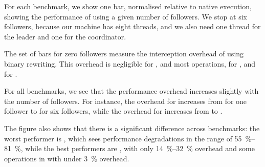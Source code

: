 For each benchmark, we show one bar, normalised relative to native
execution, showing the performance of \varan using a given number of
followers.  We stop at six followers, because our machine has eight
threads, and we also need one thread for the leader and one for the
coordinator.  

The set of bars for zero followers measure the interception overhead
of \varan using binary rewriting.  This overhead is negligible for
\lighttpdtwo, \memcached and most \redis operations, \nginxIntercept for
\nginx, and \beanstalkdIntercept for \beanstalkd.

For all benchmarks, we see that the performance overhead increases
slightly with the number of followers.  For instance, the overhead for
\beanstalkd increases from \beanstalkdOneFollower for one follower to
\beanstalkdSixFollowers for six followers, while the overhead for
\memcached increases from \memcachedOneFollower to
\memcachedSixFollowers.

The figure also shows that there is a significant difference across
benchmarks: the worst performer is \beanstalkd, which sees performance
degradations in the range of \SIrange{55}{81}{\percent}, while the best performers are
\memcached, with only \SIrange{14}{32}{\percent} overhead and some operations in \redis
with under \SI{3}{\percent} overhead.
